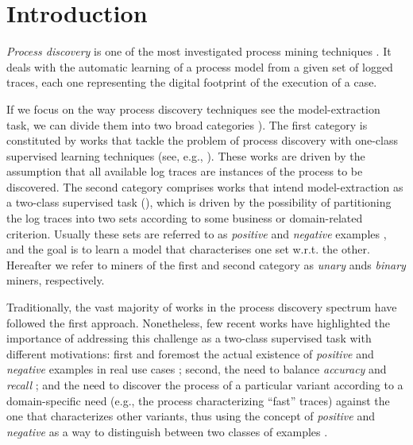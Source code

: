 

\section{Introduction}
\label{sec:introduction}

\emph{Process discovery} is one of the most investigated process mining techniques \cite{2012-Aalst}. It deals with the automatic learning of a process model from a given set of logged traces, each one representing the digital footprint of the execution of a case.

If we focus on the way process discovery techniques see the model-extraction task, we can divide them into two broad categories \cite{2018-Ponce}). The first category is constituted by works that tackle the problem of process discovery with one-class supervised learning techniques (see, e.g., \cite{2004-Aalst,2003-Weijters,2007-Gunther,2010-Aalst}). These works are driven by the assumption that all available log traces are instances of the process to be discovered. The second category comprises works that intend model-extraction as a two-class supervised task (\cite{2006-Maruster,2009-Goedertier,2009-Chesani}), which is driven by the possibility of partitioning the log traces into two sets according to some business or domain-related criterion. Usually these sets are referred to as \emph{positive} and \emph{negative} examples \cite{2018-Ponce}, and the goal is to learn a model that characterises one set w.r.t. the other. Hereafter we refer to miners of the first and second category as \emph{unary} ands \emph{binary} miners, respectively. 

Traditionally, the vast majority of works in the process discovery spectrum have followed the first approach. Nonetheless, few recent works \cite{2018-Ponce,DBLP:conf/bpm/SlaatsDB21,deviant-arxiv} have highlighted the importance of addressing this challenge as a two-class supervised task with different motivations: first and foremost the actual existence of \emph{positive} and \emph{negative} examples in real use cases \cite{2018-Ponce,DBLP:conf/bpm/SlaatsDB21}; second, the need to balance \emph{accuracy} and \emph{recall} \cite{DBLP:conf/bpm/SlaatsDB21}; and the need to discover the process of a particular variant according to a domain-specific need (e.g., the process characterizing ``fast'' traces) against the one that characterizes other variants, thus using the concept of \emph{positive} and \emph{negative} as a way to distinguish between two classes of examples \cite{deviant-arxiv}.  

